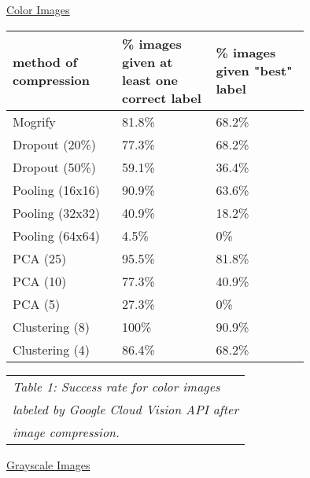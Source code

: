 \documentclass[letterpaper, 10 pt, conference]{ieeeconf}  %
\begin{document}
\hspace*{28mm} \underline{Color Images}

\vspace*{2mm}

\bgroup
\def\arraystretch{1.2} %
\begin{tabular}{|p{0.25\linewidth}|p{0.25\linewidth}|p{0.25\linewidth}|}
\hline
{\bf method of compression} & {\bf \% images given at least one correct label}
	& {\bf \% images given "best" label} \\
\hline
Mogrify & 81.8\% & 68.2\% \\ %
\hline
Dropout (20\%) & 77.3\% & 68.2\% \\ %
\hline
Dropout (50\%) & 59.1\% & 36.4\% \\ %
\hline
Pooling (16x16) & 90.9\% & 63.6\% \\ %
\hline
Pooling (32x32) & 40.9\% & 18.2\% \\ %
\hline
Pooling (64x64) & 4.5\% & 0\% \\ %
\hline
PCA (25) & 95.5\% & 81.8\% \\ %
\hline
PCA (10) & 77.3\% & 40.9\% \\ %
\hline
PCA (5) & 27.3\% & 0\% \\ %
\hline
Clustering (8) & 100\% & 90.9\% \\ %
\hline
Clustering (4) & 86.4\% & 68.2\% \\ %
\hline
\end{tabular}
\egroup

\vspace*{2mm}
\begin{tabular}{l}
{\it Table 1: Success rate for color images} \\
{\it labeled by Google Cloud Vision API after} \\
{\it image compression.} \\
\end{tabular}
\vspace*{4mm}

\vspace*{2mm}

\hspace*{28mm} \underline{Grayscale Images}

\vspace*{2mm}
\end{document}
